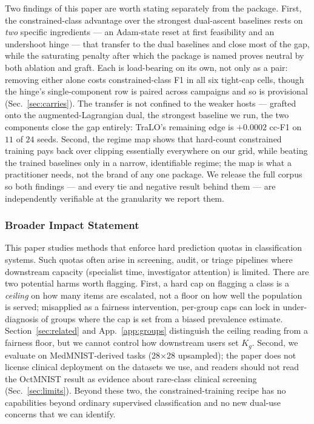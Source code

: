 \documentclass[10pt]{article}
\begin{document}
Two findings of this paper are worth stating separately from the
package. First, the constrained-class advantage over the strongest
dual-ascent baselines rests on \emph{two} specific ingredients --- an
Adam-state reset at first feasibility and an undershoot hinge --- that
transfer to the dual baselines and close most of the gap, while the
saturating penalty after which the package is named proves neutral by
both ablation and graft.{ Each is load-bearing on its own, not only as
a pair: removing either alone costs constrained-class F1 in all six tight-cap
cells, though the hinge's single-component row is paired across campaigns and so
is provisional (Sec.~\ref{sec:carries}). The transfer is not confined to the
weaker hosts --- grafted onto the augmented-Lagrangian dual, the strongest
baseline we run, the two components close the gap entirely: TraLO's remaining
edge is $+0.0002$ cc-F1 on $11$ of $24$ seeds.} Second, the regime map shows that hard-count
constrained training pays back over clipping essentially everywhere on
our grid, while beating the trained baselines only in a narrow,
identifiable regime; the map is what a practitioner needs, not the
brand of any one package. We release the full corpus so both findings
--- and every tie and negative result behind them --- are independently
verifiable at the granularity we report them.

\subsubsection*{Broader Impact Statement}
This paper studies methods that enforce hard prediction quotas in
classification systems. Such quotas often arise in screening, audit, or
triage pipelines where downstream capacity (specialist time, investigator
attention) is limited. There are two potential harms worth flagging.
First, a hard cap on flagging a class is a \emph{ceiling} on how many
items are escalated, not a floor on how well the population is served;
misapplied as a fairness intervention, per-group caps can lock in
under-diagnosis of groups where the cap is set from a biased prevalence
estimate. Section~\ref{sec:related} and App.~\ref{app:groups} distinguish
the ceiling reading from a fairness floor, but we cannot control how
downstream users set $K_g$. Second, we evaluate on MedMNIST-derived
tasks (28$\times$28 upsampled); the paper does not license clinical
deployment on the datasets we use, and readers should not read the
OctMNIST result as evidence about rare-class clinical screening
(Sec.~\ref{sec:limits}). Beyond these two, the constrained-training
recipe has no capabilities beyond ordinary supervised classification and
no new dual-use concerns that we can identify.
\end{document}

